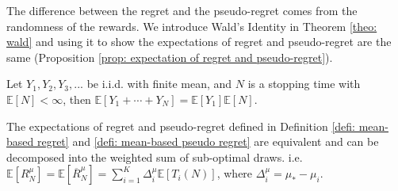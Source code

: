 The difference between the regret and the pseudo-regret comes from the randomness of the rewards. We introduce Wald's Identity in Theorem \ref{theo: wald} and using it to show the expectations of regret and pseudo-regret are the same (Proposition \ref{prop: expectation of regret and pseudo-regret}).

\begin{theo}
\label{theo: wald}
Let $Y_1, Y_2, Y_3, ...$ be i.i.d. with finite mean, and $N$ is a stopping time with $\mathbb{E}[N] < \infty$, then $\mathbb{E}\left[Y_{1}+\cdots+Y_{N}\right]=\mathbb{E}\left[Y_{1}\right] \mathbb{E}[N]$.
\end{theo}

\begin{prop}
\label{prop: expectation of regret and pseudo-regret}
The expectations of regret and pseudo-regret defined in Definition \ref{defi: mean-based regret} and \ref{defi: mean-based pseudo regret} are equivalent and can be decomposed into the weighted sum of sub-optimal draws. i.e. $\mathbb{E}[R^\mu_N] = \mathbb{E}[\overline{R}^\mu_{N}] = \sum_{i=1}^K \Delta^\mu_i \mathbb{E}[T_i(N)]$, where $\Delta^\mu_i = \mu_\ast - \mu_i$.
\end{prop}

